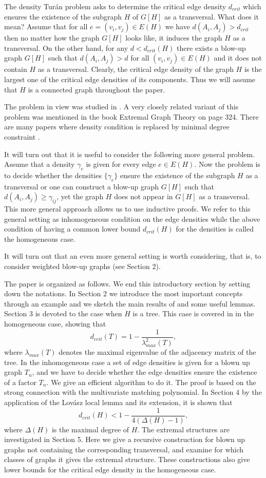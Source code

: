 \documentclass[12pt,a4paper]{amsart}
\numberwithin{equation}{section}
\begin{document}
The density Tur\'an problem asks to determine the critical edge density
$d_{crit}$ which ensures the existence of the subgraph $H$ of $G[H]$ as a
transversal. What does it mean? Assume that for
all $e=(v_i,v_j) \in E(H)$ we have $d(A_i,A_j)>d_{crit}$ then no matter how the
graph $G[H]$ looks like, it induces the graph $H$ as a transversal. On
the other hand, for any $d<d_{crit}(H)$ there exists a blow-up graph $G[H]$
such that $d(A_i,A_j)>d$ for all $(v_i,v_j)\in E(H)$ and it does not contain $H$
as a transversal. Clearly, the critical edge density of the graph $H$ is the
largest one of the critical edge densities of its components. Thus we 
 will assume that $H$ is a connected graph throughout the paper.  

The  problem in view was studied in  \cite{nagy1}. A very closely related
variant of this problem was mentioned in the book Extremal Graph Theory
\cite{bol1} on page 324.  There are many papers where density condition is
replaced by minimal degree constraint \cite{bol2,bol3,jin,yuster}.
\bigskip

It will turn out that it is useful to consider the following more general
problem. Assume that a density $\gamma_e$ is given for every edge $e\in
E(H)$. Now the problem is to decide whether the densities $\{\gamma_e\}$
ensure the existence of the subgraph $H$ as a transversal or one can construct
a blow-up graph $G[H]$ such that $d(A_i,A_j)\geq \gamma_{ij}$, yet the graph
$H$ does not appear in $G[H]$ as a transversal. This more general approach
allows us to use inductive proofs.
We refer to this general setting as inhomogeneous condition on the edge
densities while the above condition of having a common lower bound
$d_{crit}(H)$ for the densities is called the homogeneous case. 

It will turn out that an even more general setting is worth considering,
that is, to consider weighted blow-up graphs (see Section 2). 

The paper is organized as follows. We end this introductory section by setting
down the notations. In Section 2 we introduce the most important concepts
through an example and  we sketch the main results of
\cite{nagy1} and some useful lemmas. Section 3 is devoted to the case when $H$
is a tree. This case is covered in \cite{nagy1} in the homogeneous case, showing
that $$d_{crit}(T)=1-\frac{1}{\lambda^2_{max}(T)},$$ where $\lambda_{max}(T)$
denotes the maximal 
eigenvalue of the adjacency matrix of the tree. In the inhomogeneous case a
set of edge densities is given for a blown up graph $T_n$, and we have to
decide whether the edge densities ensure the existence of a factor $T_n$. 
We give an efficient algorithm to do it. The proof is based on the strong
connection with the multivariate matching polynomial. 
In Section 4 by the application of the Lov\'asz local lemma and its extension,
it is shown that $$d_{crit}(H)<1-\frac{1}{4(\Delta(H)-1)},$$ where $\Delta(H)$
is the maximal degree of $H$. 
The extremal structures are investigated in Section 5. Here we give a recursive
construction for blown up graphs not containing the corresponding transversal,
and examine for which classes of graphs it gives the extremal structure. These
constructions also give lower bounds for the critical edge density in the
homogeneous case. 
\bigskip
\end{document}
